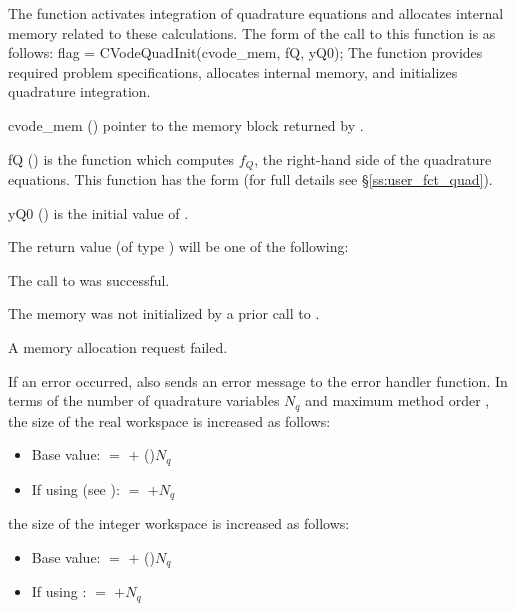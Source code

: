 The function  activates integration of quadrature equations 
and allocates internal memory related to these calculations.
The form of the call to this function is as follows:
{
flag = CVodeQuadInit(cvode\_mem, fQ, yQ0);
}
{
  The function  provides required problem specifications,
  allocates internal memory, and initializes quadrature integration.
}
{
  \begin{args}
  \item[cvode\_mem] ()
    pointer to the {\cvodes} memory block returned by .
  \item[fQ] ()
    is the {\CC} function which computes $f_Q$, the right-hand side of the quadrature
    equations. This function has the form 
     (for full details see \S\ref{ss:user_fct_quad}).
  \item[yQ0] ()
    is the initial value of .
  \end{args}
}
{
  The return value  (of type ) will be one of the following:
  \begin{args}
  \item[\Id{CV\_SUCCESS}]
    The call to  was successful.
  \item[\Id{CV\_MEM\_NULL}] 
    The {\cvodes} memory was not initialized by a prior call to .
  \item[\Id{CV\_MEM\_FAIL}] 
    A memory allocation request failed.
  \end{args}
}
{
  If an error occurred,  also sends an error message to the
  error handler function.
}
In terms of the number of quadrature variables $N_q$ and maximum method order ,
the size of the real workspace is increased as follows:
\begin{itemize}
\item Base value:  $=$  $+$ ()$N_q$
\item If using  (see ):  $=$  $+ N_q$ 
\end{itemize}
the size of the integer workspace is increased as follows:
\begin{itemize}
\item Base value:  $=$  $+$ ()$N_q$
\item If using :  $=$  $+ N_q$ 
\end{itemize}

